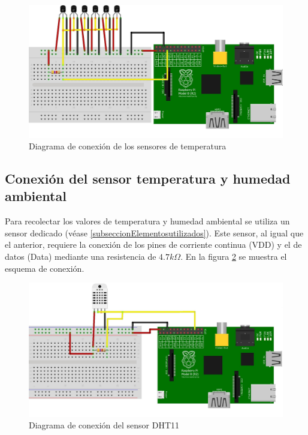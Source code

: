         \begin{figure}[h]
            \centering
            \includegraphics[scale = 0.8]{DiagramaSensordeTemp_bb.jpg}
            \caption{Diagrama de conexión de los sensores de temperatura}
            \label{fig:ConexionTemperatura}
        \end{figure}
        
    \subsection{Conexión del sensor temperatura y humedad ambiental}
        \par Para recolectar los valores de temperatura y humedad ambiental se utiliza un sensor dedicado (véase \ref{subseccionElementosutilizados}). Este sensor, al igual que el anterior, requiere la conexión de los pines de corriente continua (VDD) y el de datos (Data) mediante una resistencia de $4.7k\Omega$. En la figura \ref{fig:EsquemaDHT11} se muestra el esquema de conexión.
        
        \begin{figure}[h]
            \centering
            \includegraphics[scale = 0.8]{DiagramaSensorDHT11_bb.jpg}
            \caption{Diagrama de conexión del sensor DHT11}
            \label{fig:EsquemaDHT11}
        \end{figure}

